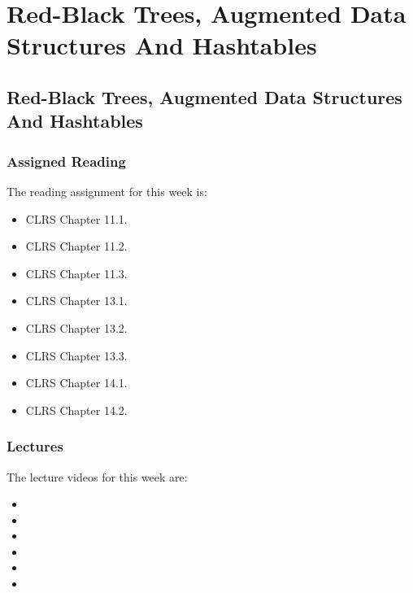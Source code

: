 \clearpage

\renewcommand{\ChapTitle}{Red-Black Trees, Augmented Data Structures And Hashtables}
\renewcommand{\SectionTitle}{Red-Black Trees, Augmented Data Structures And Hashtables}

\chapter{\ChapTitle}
\section{\SectionTitle}

\subsection{Assigned Reading}

The reading assignment for this week is:

\begin{itemize}
    \item CLRS Chapter 11.1.
    \item CLRS Chapter 11.2.
    \item CLRS Chapter 11.3.
    \item CLRS Chapter 13.1.
    \item CLRS Chapter 13.2.
    \item CLRS Chapter 13.3.
    \item CLRS Chapter 14.1.
    \item CLRS Chapter 14.2.
\end{itemize}

\subsection{Lectures}

The lecture videos for this week are:

\begin{itemize}
    \item {}
    \item {}
    \item {}
    \item {}
    \item {}
    \item {}
\end{itemize}

